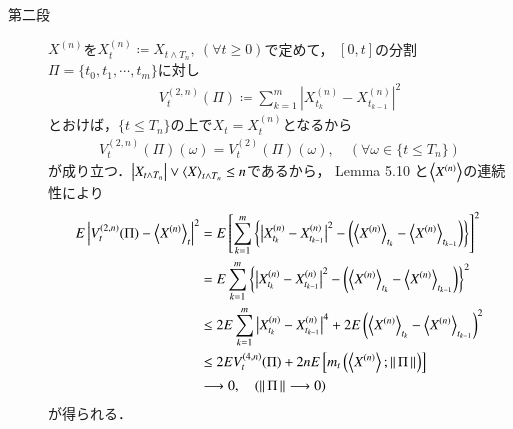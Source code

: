 \begin{prf}
\begin{description}
			\item[第二段]
				$X^{(n)}$を$X^{(n)}_t \coloneqq X_{t \wedge T_n},\ (\forall t \geq 0)$で定めて，
				$[0,t]$の分割$\Pi = \{t_0,t_1,\cdots,t_m\}$に対し
				\begin{align}
					V^{(2,n)}_t(\Pi) \coloneqq \sum_{k=1}^m \left|X^{(n)}_{t_k} - X^{(n)}_{t_{k-1}}\right|^2
				\end{align}
				とおけば，$\{t \leq T_n\}$の上で$X_t = X^{(n)}_t$となるから
				\begin{align}
					V^{(2,n)}_t(\Pi)(\omega) = V^{(2)}_t(\Pi)(\omega),
					\quad \left(\forall \omega \in \{t \leq T_n\}\right)
					\label{eq:chapter_1_theorem_5_8_2}
				\end{align}
				が成り立つ．$\left|X_{t \wedge T_n}\right| \vee \inprod<X>_{t \wedge T_n} \leq n$であるから，
				Lemma 5.10 と$\inprod<X^{(n)}>$の連続性により
				\begin{align}
					E \left| V_t^{(2,n)}(\Pi) - \inprod<X^{(n)}>_t \right|^2
					&= E \left[ \sum_{k=1}^m \left\{\left|X^{(n)}_{t_k} - X^{(n)}_{t_{k-1}}\right|^2 
						- \left(\inprod<X^{(n)}>_{t_k} - \inprod<X^{(n)}>_{t_{k-1}}\right)\right\} \right]^2 \\
					&= E \sum_{k=1}^m \left\{ \left|X^{(n)}_{t_k} - X^{(n)}_{t_{k-1}}\right|^2 
						- \left(\inprod<X^{(n)}>_{t_k} - \inprod<X^{(n)}>_{t_{k-1}}\right) \right\}^2 \\
					&\leq 2 E \sum_{k=1}^m \left|X^{(n)}_{t_k} - X^{(n)}_{t_{k-1}}\right|^4
						+ 2 E \left(\inprod<X^{(n)}>_{t_k} - \inprod<X^{(n)}>_{t_{k-1}}\right)^2 \\
					&\leq 2 E V_t^{(4,n)}(\Pi) 
						+ 2 n E \left[ m_t\left(\inprod<X^{(n)}>;\Norm{\Pi}{}\right) \right] \\
					&\longrightarrow 0,\quad (\Norm{\Pi}{} \longrightarrow 0)
				\end{align}
				が得られる．
			

\end{description}
\end{prf}
